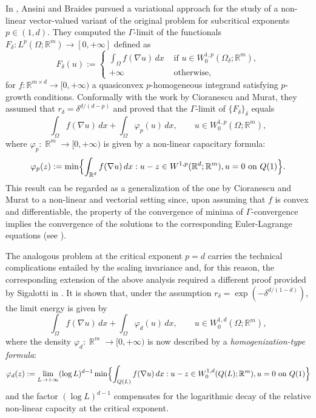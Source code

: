 \documentclass{article}
\theoremstyle{plain}
\theoremstyle{definition}
\DeclareMathOperator*{\R}{\mathbb{R}}
\numberwithin{equation}{section}
\begin{document}
In \cite{AnsBraJMPA}, Ansini and Braides pursued a variational approach for the study of a non-linear vector-valued variant of the original problem for subcritical exponents $p\in(1,d)$. They computed the $\Gamma$-limit of the functionals $F_\delta:L^{p}(\Omega; \mathbb R^m)\to[0,+\infty]$ defined as
    \begin{equation*}
        F_\delta(u):=\begin{cases} \displaystyle
            \int_\Omega f(\nabla u)\, dx  & \text{ if } u\in W^{1,p}_0(\Omega_\delta; \mathbb R^m), \\
            +\infty & \text{ otherwise}, 
        \end{cases}
    \end{equation*}
    for $f: \mathbb R^{m\times d}\to[0,+\infty)$ a quasiconvex $p$-homogeneous integrand satisfying $p$-growth conditions. Conformally with the work by Cioranescu and Murat, they assumed that $r_\delta = \delta^{d/(d-p)}$ and proved that the $\Gamma$-limit of $\{F_\delta\}_\delta$ equals 
\begin{equation*}
    \int_\Omega f(\nabla u)\, dx+\int_\Omega\varphi_p(u)\,dx, \qquad  u\in W^{1,p}_0(\Omega;\mathbb R^m),
\end{equation*}
where $\varphi_p:\R^m\to[0,+\infty)$ is given by a non-linear capacitary formula:
\begin{equation*}
    \varphi_p(z):=\min\Bigl\{\int_{\mathbb R^d} f(\nabla u)\, dx : u-z\in W^{1,p}(\mathbb R^d; \mathbb R^m), u=0 \text{ on } Q(1)\Bigr\}.
\end{equation*}
This result can be regarded as a generalization of the one by Cioranescu and Murat to a non-linear and vectorial setting since, upon assuming that $f$ is convex and differentiable, the property of the convergence of minima of $\Gamma$-convergence implies the convergence of the solutions to the corresponding Euler-Lagrange equations (see \cite{BDF, DM}). 

The analogous problem at the critical exponent $p=d$ carries the technical complications entailed by the scaling invariance and, for this reason, the corresponding extension of the above analysis required a different proof provided by Sigalotti in \cite{Sig-cont}. It is shown that, under the assumption $r_\delta= \exp(-\delta^{d/(1-d)})$, the limit energy is given by 
\begin{equation*}
    \int_\Omega f(\nabla u)\, dx+\int_\Omega\varphi_d(u)\,dx, \qquad  u\in W^{1,d}_0(\Omega;\mathbb R^m),
\end{equation*}
where the density $\varphi_d:\R^m\to[0,+\infty)$ is now described by a {\em homogenization-type formula}:
\begin{equation*}\varphi_d(z):= \lim_{L\to+\infty}(\log L)^{d-1}\min\Bigl\{\int_{Q(L)} f(\nabla u)\, dx : u-z\in W^{1,d}_0(Q(L); \mathbb R^m), u=0 \text{ on } Q(1)\Bigr\}
\end{equation*}
and the factor $(\log L)^{d-1}$ compensates for the logarithmic decay of the relative non-linear capacity at the critical exponent. 
\end{document}
